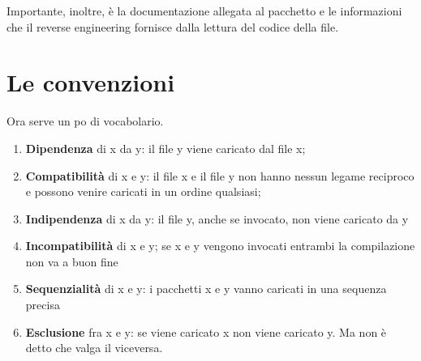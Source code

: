 Importante, inoltre, è la documentazione allegata al  pacchetto e le informazioni che il 
\foreignlanguage{english}{reverse engineering} fornisce dalla lettura del codice della file. 
\section{Le convenzioni}
 Ora serve un po di vocabolario. 
 \begin{enumerate}
 	\item \textbf{Dipendenza} di x da y: il file y viene caricato dal file x;
 	\item \textbf{Compatibilità} di x e y: il file x e il file y non hanno nessun legame reciproco e possono venire caricati in un ordine qualsiasi;
 	\item \textbf{Indipendenza} di x da y: il file y, anche se invocato, non viene caricato da y
 	\item \textbf{Incompatibilità} di x e y; se x e y vengono invocati entrambi la compilazione non va a buon fine
 	\item \textbf{Sequenzialità } di x e y: i pacchetti x e y vanno caricati in una sequenza precisa
 	\item \textbf{Esclusione} fra x e y: se viene caricato x non viene caricato y. Ma non è detto che valga il viceversa.
 \end{enumerate}
